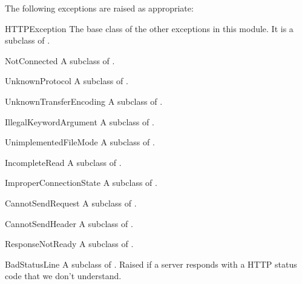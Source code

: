 The following exceptions are raised as appropriate:

\begin{excdesc}{HTTPException}
The base class of the other exceptions in this module.  It is a
subclass of .
\end{excdesc}

\begin{excdesc}{NotConnected}
A subclass of .
\end{excdesc}

\begin{excdesc}{UnknownProtocol}
A subclass of .
\end{excdesc}

\begin{excdesc}{UnknownTransferEncoding}
A subclass of .
\end{excdesc}

\begin{excdesc}{IllegalKeywordArgument}
A subclass of .
\end{excdesc}

\begin{excdesc}{UnimplementedFileMode}
A subclass of .
\end{excdesc}

\begin{excdesc}{IncompleteRead}
A subclass of .
\end{excdesc}

\begin{excdesc}{ImproperConnectionState}
A subclass of .
\end{excdesc}

\begin{excdesc}{CannotSendRequest}
A subclass of .
\end{excdesc}

\begin{excdesc}{CannotSendHeader}
A subclass of .
\end{excdesc}

\begin{excdesc}{ResponseNotReady}
A subclass of .
\end{excdesc}

\begin{excdesc}{BadStatusLine}
A subclass of .  Raised if a server responds with a
HTTP status code that we don't understand.
\end{excdesc}


